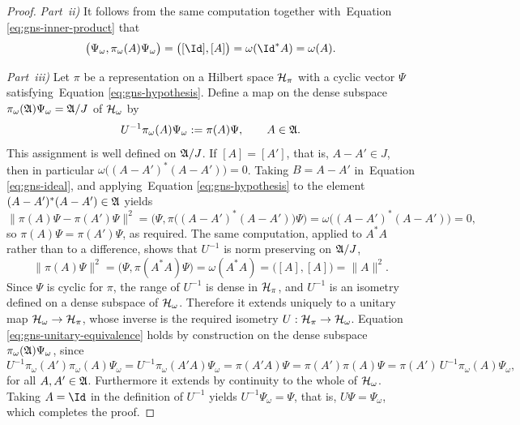 \begin{proof}
	\vspace{0.5cm}
	
	\noindent \textit{Part~ii)} It follows from the same computation together with~Equation \eqref{eq:gns-inner-product} that
	\begin{equation}
		\big(\Psi_\omega, \pi_\omega(A)\Psi_\omega\big) = \big([\Id],[A]\big) = \omega(\Id^*A) = \omega(A).
	\end{equation}
	
	\vspace{0.5cm}
	
	\noindent \textit{Part~iii)} Let $\pi$ be a representation on a Hilbert space $\H_\pi$ with a cyclic vector $\Psi$ satisfying~Equation \eqref{eq:gns-hypothesis}. Define a map on the dense subspace $\pi_\omega(\mathfrak{A})\Psi_\omega = \mathfrak{A}/J$ of $\H_\omega$ by
	\begin{equation}
		U^{-1} \pi_\omega(A)\Psi_\omega := \pi(A)\Psi, \qquad A \in \mathfrak{A}.
	\end{equation}
	This assignment is well defined on $\mathfrak{A}/J$. If $[A]=[A']$, that is, $A-A' \in J$, then in particular $\omega\big((A-A')^*(A-A')\big) = 0$. Taking $B=A-A'$ in~Equation \eqref{eq:gns-ideal}, and applying~Equation \eqref{eq:gns-hypothesis} to the element $(A-A')^*(A-A') \in \mathfrak{A}$ yields
	\begin{equation}
		\big\|\pi(A)\Psi - \pi(A')\Psi\big\|^2 = \big(\Psi, \pi\big((A-A')^*(A-A')\big)\Psi\big) = \omega\big((A-A')^*(A-A')\big) = 0,
	\end{equation}
	so $\pi(A)\Psi = \pi(A')\Psi$, as required. The same computation, applied to $A^*A$ rather than to a difference, shows that $U^{-1}$ is norm preserving on $\mathfrak{A}/J$,
	\begin{equation}
		\|\pi(A)\Psi\|^2 = \big(\Psi, \pi(A^*A)\Psi\big) = \omega(A^*A) = \big([A],[A]\big) = \|A\|^2.
	\end{equation}
	Since $\Psi$ is cyclic for $\pi$, the range of $U^{-1}$ is dense in $\H_\pi$, and $U^{-1}$ is an isometry defined on a dense subspace of $\H_\omega$. Therefore it extends uniquely to a unitary map $\H_\omega \to \H_\pi$, whose inverse is the required isometry $U : \H_\pi \to \H_\omega$. Equation \eqref{eq:gns-unitary-equivalence} holds by construction on the dense subspace $\pi_\omega(\mathfrak{A})\Psi_\omega$, since
	\begin{equation}
		U^{-1}\pi_\omega(A')\pi_\omega(A)\Psi_\omega = U^{-1}\pi_\omega(A'A)\Psi_\omega = \pi(A'A)\Psi = \pi(A')\pi(A)\Psi = \pi(A')\,U^{-1}\pi_\omega(A)\Psi_\omega,
	\end{equation}
	for all $A,A' \in \mathfrak{A}$. Furthermore it extends by continuity to the whole of $\H_\omega$. Taking $A=\Id$ in the definition of $U^{-1}$ yields $U^{-1}\Psi_\omega = \Psi$, that is, $U\Psi = \Psi_\omega$, which completes the proof.
\end{proof}

